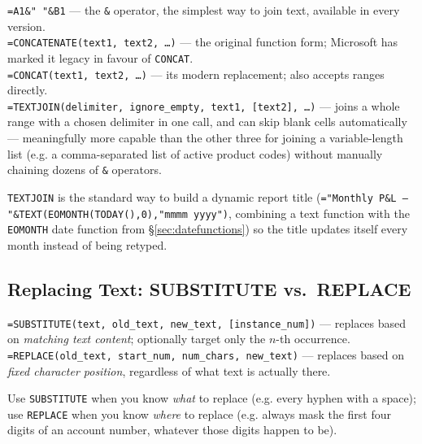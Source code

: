 \documentclass[11pt,a4paper]{article}
\begin{document}
\begin{formulasyntax}
\texttt{=A1\&" "\&B1} --- the \texttt{\&} operator, the simplest way to join text, available in every version.\\
\texttt{=CONCATENATE(text1, text2, \ldots)} --- the original function form; Microsoft has marked it legacy in favour of \texttt{CONCAT}.\\
\texttt{=CONCAT(text1, text2, \ldots)} --- its modern replacement; also accepts ranges directly.\\
\texttt{=TEXTJOIN(delimiter, ignore\_empty, text1, [text2], \ldots)} --- joins a whole range with a chosen delimiter in one call, and can skip blank cells automatically --- meaningfully more capable than the other three for joining a variable-length list (e.g. a comma-separated list of active product codes) without manually chaining dozens of \texttt{\&} operators.
\end{formulasyntax}

\begin{financeapp}
\texttt{TEXTJOIN} is the standard way to build a dynamic report title (\texttt{="Monthly P\&L --- "\&TEXT(EOMONTH(TODAY(),0),"mmmm yyyy")}, combining a text function with the \texttt{EOMONTH} date function from \S\ref{sec:datefunctions}) so the title updates itself every month instead of being retyped.
\end{financeapp}

\subsection{Replacing Text: SUBSTITUTE vs.\ REPLACE}

\begin{formulasyntax}
\texttt{=SUBSTITUTE(text, old\_text, new\_text, [instance\_num])} --- replaces based on \emph{matching text content}; optionally target only the $n$-th occurrence.\\
\texttt{=REPLACE(old\_text, start\_num, num\_chars, new\_text)} --- replaces based on \emph{fixed character position}, regardless of what text is actually there.
\end{formulasyntax}

Use \texttt{SUBSTITUTE} when you know \emph{what} to replace (e.g. every hyphen with a space); use \texttt{REPLACE} when you know \emph{where} to replace (e.g. always mask the first four digits of an account number, whatever those digits happen to be).
\end{document}
